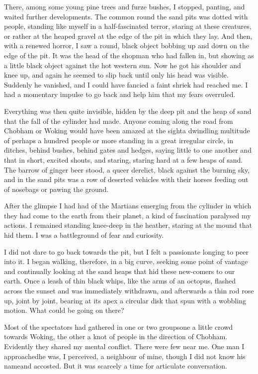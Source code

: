 There, among some young pine trees and furze bushes, I stopped,
panting, and waited further developments. The common round the sand
pits was dotted with people, standing like myself in a
half-fascinated terror, staring at these creatures, or rather at
the heaped gravel at the edge of the pit in which they lay. And
then, with a renewed horror, I saw a round, black object bobbing up
and down on the edge of the pit. It was the head of the shopman who
had fallen in, but showing as a little black object against the hot
western sun. Now he got his shoulder and knee up, and again he
seemed to slip back until only his head was visible. Suddenly he
vanished, and I could have fancied a faint shriek had reached me. I
had a momentary impulse to go back and help him that my fears
overruled.

Everything was then quite invisible, hidden by the deep pit and the
heap of sand that the fall of the cylinder had made. Anyone coming
along the road from Chobham or Woking would have been amazed at the
sight\dash{}a dwindling multitude of perhaps a hundred people or more
standing in a great irregular circle, in ditches, behind bushes,
behind gates and hedges, saying little to one another and that in
short, excited shouts, and staring, staring hard at a few heaps of
sand. The barrow of ginger beer stood, a queer derelict, black
against the burning sky, and in the sand pits was a row of deserted
vehicles with their horses feeding out of nosebags or pawing the
ground.

After the glimpse I had had of the Martians emerging from the
cylinder in which they had come to the earth from their planet, a
kind of fascination paralysed my actions. I remained standing
knee-deep in the heather, staring at the mound that hid them. I was
a battleground of fear and curiosity.

I did not dare to go back towards the pit, but I felt a passionate
longing to peer into it. I began walking, therefore, in a big
curve, seeking some point of vantage and continually looking at the
sand heaps that hid these new-comers to our earth. Once a leash of
thin black whips, like the arms of an octopus, flashed across the
sunset and was immediately withdrawn, and afterwards a thin rod
rose up, joint by joint, bearing at its apex a circular disk that
spun with a wobbling motion. What could be going on there?

Most of the spectators had gathered in one or two groups\dash{}one a
little crowd towards Woking, the other a knot of people in the
direction of Chobham. Evidently they shared my mental conflict.
There were few near me. One man I approached\dash{}he was, I perceived,
a neighbour of mine, though I did not know his name\dash{}and accosted.
But it was scarcely a time for articulate conversation.

